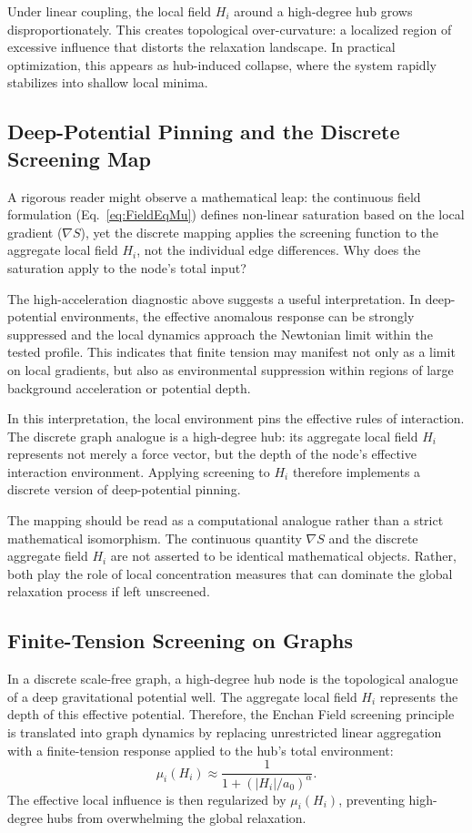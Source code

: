 \documentclass[11pt,a4paper]{article}
\begin{document}
Under linear coupling, the local field $H_i$ around a high-degree hub grows disproportionately. This creates topological over-curvature: a localized region of excessive influence that distorts the relaxation landscape. In practical optimization, this appears as hub-induced collapse, where the system rapidly stabilizes into shallow local minima.

\subsection{Deep-Potential Pinning and the Discrete Screening Map}

A rigorous reader might observe a mathematical leap: the continuous field formulation (Eq.~\ref{eq:FieldEqMu}) defines non-linear saturation based on the local gradient ($\nabla S$), yet the discrete mapping applies the screening function to the aggregate local field $H_i$, not the individual edge differences. Why does the saturation apply to the node's total input?

The high-acceleration diagnostic above suggests a useful interpretation. In deep-potential environments, the effective anomalous response can be strongly suppressed and the local dynamics approach the Newtonian limit within the tested profile. This indicates that finite tension may manifest not only as a limit on local gradients, but also as environmental suppression within regions of large background acceleration or potential depth.

In this interpretation, the local environment pins the effective rules of interaction. The discrete graph analogue is a high-degree hub: its aggregate local field $H_i$ represents not merely a force vector, but the depth of the node's effective interaction environment. Applying screening to $H_i$ therefore implements a discrete version of deep-potential pinning.

The mapping should be read as a computational analogue rather than a strict mathematical isomorphism. The continuous quantity $\nabla S$ and the discrete aggregate field $H_i$ are not asserted to be identical mathematical objects. Rather, both play the role of local concentration measures that can dominate the global relaxation process if left unscreened.

\subsection{Finite-Tension Screening on Graphs}

In a discrete scale-free graph, a high-degree hub node is the topological analogue of a deep gravitational potential well. The aggregate local field $H_i$ represents the depth of this effective potential. Therefore, the Enchan Field screening principle is translated into graph dynamics by replacing unrestricted linear aggregation with a finite-tension response applied to the hub's total environment:
\begin{equation}
\mu_i(H_i) \approx \frac{1}{1 + (|H_i|/a_0)^\alpha}.
\end{equation}
The effective local influence is then regularized by $\mu_i(H_i)$, preventing high-degree hubs from overwhelming the global relaxation.
\end{document}
